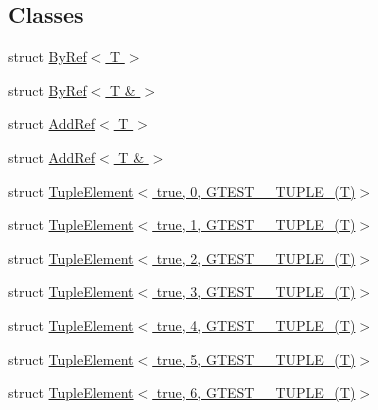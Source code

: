 \subsection*{\-Classes}
\begin{DoxyCompactItemize}
\item 
struct \hyperlink{structstd_1_1tr1_1_1gtest__internal_1_1ByRef}{\-By\-Ref$<$ T $>$}
\item 
struct \hyperlink{structstd_1_1tr1_1_1gtest__internal_1_1ByRef_3_01T_01_6_01_4}{\-By\-Ref$<$ T \& $>$}
\item 
struct \hyperlink{structstd_1_1tr1_1_1gtest__internal_1_1AddRef}{\-Add\-Ref$<$ T $>$}
\item 
struct \hyperlink{structstd_1_1tr1_1_1gtest__internal_1_1AddRef_3_01T_01_6_01_4}{\-Add\-Ref$<$ T \& $>$}
\item 
struct \hyperlink{structstd_1_1tr1_1_1gtest__internal_1_1TupleElement_3_01true_00_010_00_01GTEST__10__TUPLE___07T_08_4}{\-Tuple\-Element$<$ true, 0, G\-T\-E\-S\-T\-\_\-\_\-\-T\-U\-P\-L\-E\-\_\-(\-T)$>$}
\item 
struct \hyperlink{structstd_1_1tr1_1_1gtest__internal_1_1TupleElement_3_01true_00_011_00_01GTEST__10__TUPLE___07T_08_4}{\-Tuple\-Element$<$ true, 1, G\-T\-E\-S\-T\-\_\-\_\-\-T\-U\-P\-L\-E\-\_\-(\-T)$>$}
\item 
struct \hyperlink{structstd_1_1tr1_1_1gtest__internal_1_1TupleElement_3_01true_00_012_00_01GTEST__10__TUPLE___07T_08_4}{\-Tuple\-Element$<$ true, 2, G\-T\-E\-S\-T\-\_\-\_\-\-T\-U\-P\-L\-E\-\_\-(\-T)$>$}
\item 
struct \hyperlink{structstd_1_1tr1_1_1gtest__internal_1_1TupleElement_3_01true_00_013_00_01GTEST__10__TUPLE___07T_08_4}{\-Tuple\-Element$<$ true, 3, G\-T\-E\-S\-T\-\_\-\_\-\-T\-U\-P\-L\-E\-\_\-(\-T)$>$}
\item 
struct \hyperlink{structstd_1_1tr1_1_1gtest__internal_1_1TupleElement_3_01true_00_014_00_01GTEST__10__TUPLE___07T_08_4}{\-Tuple\-Element$<$ true, 4, G\-T\-E\-S\-T\-\_\-\_\-\-T\-U\-P\-L\-E\-\_\-(\-T)$>$}
\item 
struct \hyperlink{structstd_1_1tr1_1_1gtest__internal_1_1TupleElement_3_01true_00_015_00_01GTEST__10__TUPLE___07T_08_4}{\-Tuple\-Element$<$ true, 5, G\-T\-E\-S\-T\-\_\-\_\-\-T\-U\-P\-L\-E\-\_\-(\-T)$>$}
\item 
struct \hyperlink{structstd_1_1tr1_1_1gtest__internal_1_1TupleElement_3_01true_00_016_00_01GTEST__10__TUPLE___07T_08_4}{\-Tuple\-Element$<$ true, 6, G\-T\-E\-S\-T\-\_\-\_\-\-T\-U\-P\-L\-E\-\_\-(\-T)$>$}
\item 

\end{DoxyCompactItemize}
